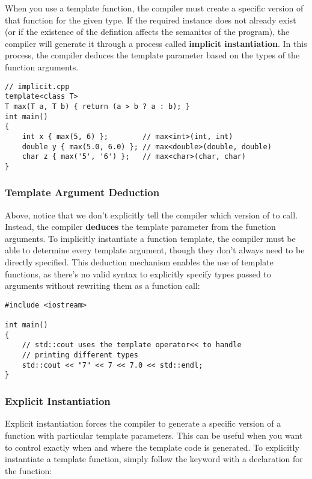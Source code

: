 \documentclass[12pt]{article}
\begin{document}
\noindent
When you use a template function, the compiler must create a specific version of that function for the given type.
If the required instance does not already exist (or if the existence of the defintion affects the semanitcs of the program), the compiler will generate it through a process called \textbf{implicit instantiation}.
In this process, the compiler deduces the template parameter  based on the types of the function arguments.

\begin{lstlisting}[style=cxx]
// implicit.cpp
template<class T>
T max(T a, T b) { return (a > b ? a : b); }
int main()
{
    int x { max(5, 6) };        // max<int>(int, int)
    double y { max(5.0, 6.0) }; // max<double>(double, double)
    char z { max('5', '6') };   // max<char>(char, char)
}
\end{lstlisting}

\subsubsection{Template Argument Deduction}

\noindent
Above, notice that we don't explicitly tell the compiler which version of  to call.
Instead, the compiler \textbf{deduces} the template parameter  from the function arguments.
To implicitly instantiate a function template, the compiler must be able to determine every template argument, though they don't always need to be directly specified.
This deduction mechanism enables the use of template  functions, as there's no valid syntax to explicitly specify types passed to arguments without rewriting them as a function call:

\begin{lstlisting}[style=cxx]
#include <iostream>

int main()
{
    // std::cout uses the template operator<< to handle
    // printing different types
    std::cout << "7" << 7 << 7.0 << std::endl;
}
\end{lstlisting}

\subsubsection{Explicit Instantiation}

\noindent
Explicit instantiation forces the compiler to generate a specific version of a function with particular template parameters.
This can be useful when you want to control exactly when and where the template code is generated.
To explicitly instantiate a template function, simply follow the  keyword with a declaration for the function:
\end{document}
